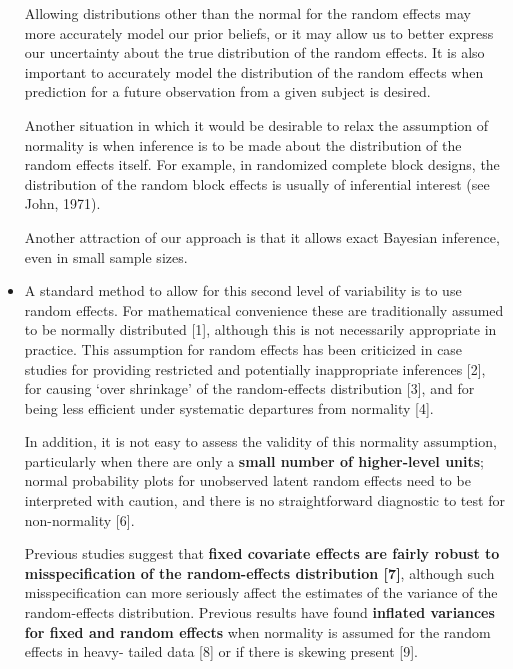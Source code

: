 \documentclass{article}
\begin{document}
\begin{itemize}
Allowing distributions other than the normal for the random effects may more accurately model our prior beliefs, or it may allow us to better express our uncertainty about the true distribution of the random effects. It is also important to accurately model the distribution of the random effects when prediction for a future observation from a given subject is desired. \par

Another situation in which it would be desirable to relax the assumption of normality is when inference is to be made about the distribution of the random effects itself. For example, in randomized complete block designs, the distribution of the random block effects is usually of inferential interest (see John, 1971).\par

Another attraction of our approach is that it allows exact Bayesian inference, even in small sample sizes. 

\item \cite{lee2008flexible} A standard method to allow for this second level of variability is to use random effects. For mathematical convenience these are traditionally assumed to be normally distributed [1], although this is not necessarily appropriate in practice. This assumption for random effects has been criticized in case studies for providing restricted and potentially inappropriate inferences [2], for causing `over shrinkage' of the random-effects distribution [3], and for being less efficient under systematic departures from normality [4].\par

In addition, it is not easy to assess the validity of this normality assumption, particularly when there are only a {\bf small number of higher-level units}; normal probability plots for unobserved latent random effects need to be interpreted with caution, and there is no straightforward diagnostic to test for non-normality [6].\par

Previous studies suggest that {\bf fixed covariate effects are fairly robust to misspecification of the random-effects distribution [7]}, although such misspecification can more seriously affect the estimates of the variance of the random-effects distribution. Previous results have found {\bf inflated variances for fixed and random effects} when normality is assumed for the random effects in heavy- tailed data [8] or if there is skewing present [9].


\end{itemize}
\end{document}

